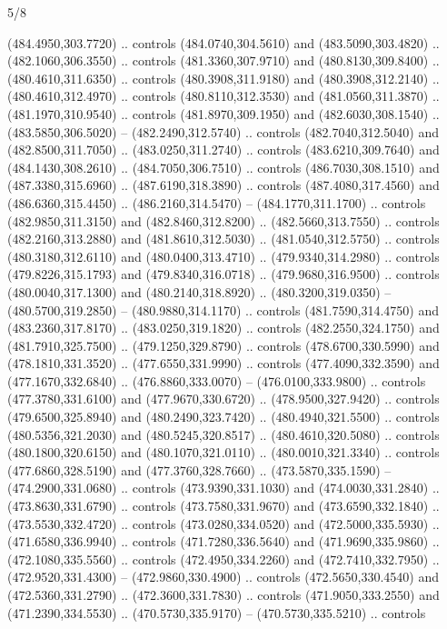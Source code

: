 \begin{flagdescription}{5/8}
\begin{scope}[xshift=0.5\flaglength,yshift=0.5\flagwidth,scale=\flagwidth/475.63]
\begin{scope}[y=0.8pt, x=0.8pt, yscale=-1, xscale=1,shift={(-450,-300)}]
\begin{scope}[cm={{1.0,0.0,0.0,1.0,(-0.0002,0.12556)}},cm={{1.0,0.0,0.0,1.0,(0.00179,0.0)}}]
  (484.4950,303.7720) .. controls (484.0740,304.5610) and (483.5090,303.4820) ..
  (482.1060,306.3550) .. controls (481.3360,307.9710) and (480.8130,309.8400) ..
  (480.4610,311.6350) .. controls (480.3908,311.9180) and (480.3908,312.2140) ..
  (480.4610,312.4970) .. controls (480.8110,312.3530) and (481.0560,311.3870) ..
  (481.1970,310.9540) .. controls (481.8970,309.1950) and (482.6030,308.1540) ..
  (483.5850,306.5020) -- (482.2490,312.5740) .. controls (482.7040,312.5040) and
  (482.8500,311.7050) .. (483.0250,311.2740) .. controls (483.6210,309.7640) and
  (484.1430,308.2610) .. (484.7050,306.7510) .. controls (486.7030,308.1510) and
  (487.3380,315.6960) .. (487.6190,318.3890) .. controls (487.4080,317.4560) and
  (486.6360,315.4450) .. (486.2160,314.5470) -- (484.1770,311.1700) .. controls
  (482.9850,311.3150) and (482.8460,312.8200) .. (482.5660,313.7550) .. controls
  (482.2160,313.2880) and (481.8610,312.5030) .. (481.0540,312.5750) .. controls
  (480.3180,312.6110) and (480.0400,313.4710) .. (479.9340,314.2980) .. controls
  (479.8226,315.1793) and (479.8340,316.0718) .. (479.9680,316.9500) .. controls
  (480.0040,317.1300) and (480.2140,318.8920) .. (480.3200,319.0350) --
  (480.5700,319.2850) -- (480.9880,314.1170) .. controls (481.7590,314.4750) and
  (483.2360,317.8170) .. (483.0250,319.1820) .. controls (482.2550,324.1750) and
  (481.7910,325.7500) .. (479.1250,329.8790) .. controls (478.6700,330.5990) and
  (478.1810,331.3520) .. (477.6550,331.9990) .. controls (477.4090,332.3590) and
  (477.1670,332.6840) .. (476.8860,333.0070) -- (476.0100,333.9800) .. controls
  (477.3780,331.6100) and (477.9670,330.6720) .. (478.9500,327.9420) .. controls
  (479.6500,325.8940) and (480.2490,323.7420) .. (480.4940,321.5500) .. controls
  (480.5356,321.2030) and (480.5245,320.8517) .. (480.4610,320.5080) .. controls
  (480.1800,320.6150) and (480.1070,321.0110) .. (480.0010,321.3340) .. controls
  (477.6860,328.5190) and (477.3760,328.7660) .. (473.5870,335.1590) --
  (474.2900,331.0680) .. controls (473.9390,331.1030) and (474.0030,331.2840) ..
  (473.8630,331.6790) .. controls (473.7580,331.9670) and (473.6590,332.1840) ..
  (473.5530,332.4720) .. controls (473.0280,334.0520) and (472.5000,335.5930) ..
  (471.6580,336.9940) .. controls (471.7280,336.5640) and (471.9690,335.9860) ..
  (472.1080,335.5560) .. controls (472.4950,334.2260) and (472.7410,332.7950) ..
  (472.9520,331.4300) -- (472.9860,330.4900) .. controls (472.5650,330.4540) and
  (472.5360,331.2790) .. (472.3600,331.7830) .. controls (471.9050,333.2550) and
  (471.2390,334.5530) .. (470.5730,335.9170) -- (470.5730,335.5210) .. controls

\end{scope}
\end{scope}
\end{scope}
\end{flagdescription}
